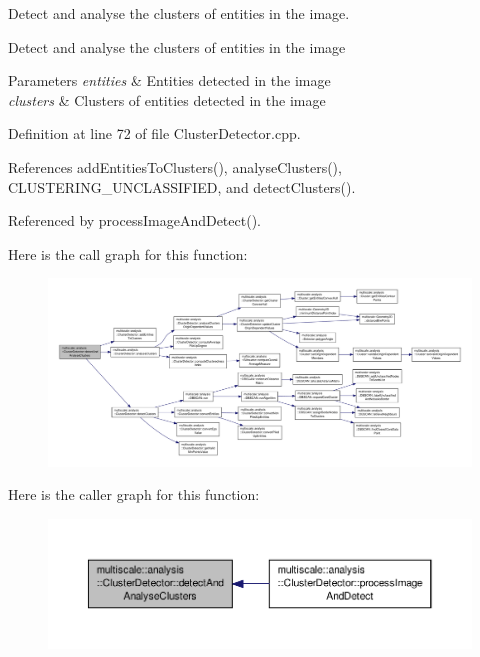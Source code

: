 Detect and analyse the clusters of entities in the image. 

Detect and analyse the clusters of entities in the image


\begin{DoxyParams}{Parameters}
{\em entities} & Entities detected in the image \\
\hline
{\em clusters} & Clusters of entities detected in the image \\
\hline
\end{DoxyParams}


Definition at line 72 of file Cluster\-Detector.\-cpp.



References add\-Entities\-To\-Clusters(), analyse\-Clusters(), C\-L\-U\-S\-T\-E\-R\-I\-N\-G\-\_\-\-U\-N\-C\-L\-A\-S\-S\-I\-F\-I\-E\-D, and detect\-Clusters().



Referenced by process\-Image\-And\-Detect().



Here is the call graph for this function\-:
\nopagebreak
\begin{figure}[H]
\begin{center}
\leavevmode
\includegraphics[width=350pt]{classmultiscale_1_1analysis_1_1ClusterDetector_a46f98e066e74171774f0b6728118bc7b_cgraph}
\end{center}
\end{figure}




Here is the caller graph for this function\-:\nopagebreak
\begin{figure}[H]
\begin{center}
\leavevmode
\includegraphics[width=350pt]{classmultiscale_1_1analysis_1_1ClusterDetector_a46f98e066e74171774f0b6728118bc7b_icgraph}
\end{center}
\end{figure}


